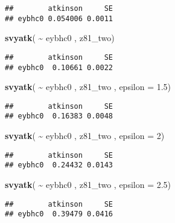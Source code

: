 \documentclass[
]{book}
\newenvironment{Shaded}{\begin{snugshade}}{\end{snugshade}}
\newcommand{\AttributeTok}[1]{\textcolor[rgb]{0.13,0.29,0.53}{#1}}
\newcommand{\DecValTok}[1]{\textcolor[rgb]{0.00,0.00,0.81}{#1}}
\newcommand{\FloatTok}[1]{\textcolor[rgb]{0.00,0.00,0.81}{#1}}
\newcommand{\FunctionTok}[1]{\textcolor[rgb]{0.13,0.29,0.53}{\textbf{#1}}}
\newcommand{\NormalTok}[1]{#1}
\newcommand{\SpecialCharTok}[1]{\textcolor[rgb]{0.81,0.36,0.00}{\textbf{#1}}}
\begin{document}
\begin{verbatim}
##        atkinson     SE
## eybhc0 0.054006 0.0011
\end{verbatim}

\begin{Shaded}
\begin{Highlighting}[]
\FunctionTok{svyatk}\NormalTok{( }\SpecialCharTok{\textasciitilde{}}\NormalTok{ eybhc0 , z81\_two)}
\end{Highlighting}
\end{Shaded}

\begin{verbatim}
##        atkinson     SE
## eybhc0  0.10661 0.0022
\end{verbatim}

\begin{Shaded}
\begin{Highlighting}[]
\FunctionTok{svyatk}\NormalTok{( }\SpecialCharTok{\textasciitilde{}}\NormalTok{ eybhc0 , z81\_two , }\AttributeTok{epsilon =} \FloatTok{1.5}\NormalTok{)}
\end{Highlighting}
\end{Shaded}

\begin{verbatim}
##        atkinson     SE
## eybhc0  0.16383 0.0048
\end{verbatim}

\begin{Shaded}
\begin{Highlighting}[]
\FunctionTok{svyatk}\NormalTok{( }\SpecialCharTok{\textasciitilde{}}\NormalTok{ eybhc0 , z81\_two , }\AttributeTok{epsilon =} \DecValTok{2}\NormalTok{)}
\end{Highlighting}
\end{Shaded}

\begin{verbatim}
##        atkinson     SE
## eybhc0  0.24432 0.0143
\end{verbatim}

\begin{Shaded}
\begin{Highlighting}[]
\FunctionTok{svyatk}\NormalTok{( }\SpecialCharTok{\textasciitilde{}}\NormalTok{ eybhc0 , z81\_two , }\AttributeTok{epsilon =} \FloatTok{2.5}\NormalTok{)}
\end{Highlighting}
\end{Shaded}

\begin{verbatim}
##        atkinson     SE
## eybhc0  0.39479 0.0416
\end{verbatim}
\end{document}
